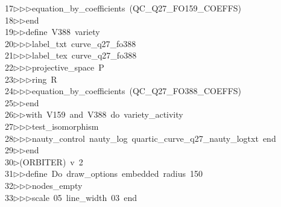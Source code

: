 \begin{tabbing}
17\>$\triangleright$\>$\triangleright$\>$\triangleright$\>equation\_by\_coefficients\ (QC\_Q27\_FO159\_COEFFS)\ \\[0pt]
18\>$\triangleright$\>$\triangleright$\>end\ \\[0pt]
19\>$\triangleright$\>$\triangleright$\>define\ V388\ variety\ \\[0pt]
20\>$\triangleright$\>$\triangleright$\>$\triangleright$\>label\_txt\ curve\_q27\_fo388\ \\[0pt]
21\>$\triangleright$\>$\triangleright$\>$\triangleright$\>label\_tex\ curve\_q27\_fo388\ \\[0pt]
22\>$\triangleright$\>$\triangleright$\>$\triangleright$\>projective\_space\ P\ \\[0pt]
23\>$\triangleright$\>$\triangleright$\>$\triangleright$\>ring\ R\ \\[0pt]
24\>$\triangleright$\>$\triangleright$\>$\triangleright$\>equation\_by\_coefficients\ (QC\_Q27\_FO388\_COEFFS)\ \\[0pt]
25\>$\triangleright$\>$\triangleright$\>end\ \\[0pt]
26\>$\triangleright$\>$\triangleright$\>with\ V159\ and\ V388\ do\ variety\_activity\ \\[0pt]
27\>$\triangleright$\>$\triangleright$\>$\triangleright$\>test\_isomorphism\ \\[0pt]
28\>$\triangleright$\>$\triangleright$\>$\triangleright$\>nauty\_control\ nauty\_log\ quartic\_curve\_q27\_nauty\_logtxt\ end\ \\[0pt]
29\>$\triangleright$\>$\triangleright$\>end\\[0pt]
30\>$\triangleright$\>(ORBITER)\ v\ 2\ \\[0pt]
31\>$\triangleright$\>$\triangleright$\>define\ Do\ draw\_options\ embedded\ radius\ 150\ \\[0pt]
32\>$\triangleright$\>$\triangleright$\>$\triangleright$\>nodes\_empty\ \\[0pt]
33\>$\triangleright$\>$\triangleright$\>$\triangleright$\>scale\ 05\ line\_width\ 03\ end\ \\[0pt]

\end{tabbing}
